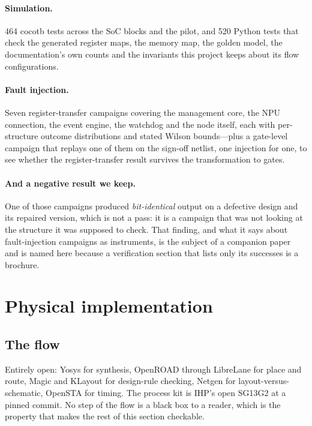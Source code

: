 \documentclass[11pt,a4paper]{article}
\begin{document}
\paragraph{Simulation.} \num{464} cocotb tests across the SoC blocks and
the pilot, and \num{520} Python tests that check the generated register
maps, the memory map, the golden model, the documentation's own counts
and the invariants this project keeps about its flow configurations.

\paragraph{Fault injection.} Seven register-transfer campaigns covering
the management core, the NPU connection, the event engine, the watchdog
and the node itself, each with per-structure outcome distributions and
stated Wilson bounds---plus a gate-level campaign that replays one of
them on the sign-off netlist, one injection for one, to see whether the
register-transfer result survives the transformation to gates.

\paragraph{And a negative result we keep.} One of those campaigns
produced \emph{bit-identical} output on a defective design and its
repaired version, which is not a pass: it is a campaign that was not
looking at the structure it was supposed to check. That finding, and
what it says about fault-injection campaigns as instruments, is the
subject of a companion paper~\cite{companion_tmr} and is named here
because a verification section that lists only its successes is a
brochure.

\section{Physical implementation}
\label{sec:phys}

\subsection{The flow}

Entirely open: Yosys for synthesis, OpenROAD through LibreLane for place
and route, Magic and KLayout for design-rule checking, Netgen for
layout-versus-schematic, OpenSTA for timing. The process kit is IHP's
open SG13G2 at a pinned commit. No step of the flow is a black box to a
reader, which is the property that makes the rest of this section
checkable.
\end{document}
